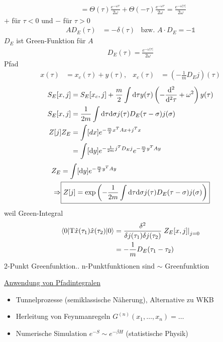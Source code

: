 \begin{enumerate}[1)]
\begin{align*}
				&= \Theta(\tau) \frac{e^{-\omega \tau}}{2 \omega} 
				+ \Theta (-\tau) \frac{e^{-\omega \tau}}{2 \omega} = \frac{e^{-\omega|\tau|}}{2 \omega}
			\end{align*}
			$+$ für $\tau < 0$ und $-$ für $\tau > 0$
			\begin{align*}
				A D_E(\tau) &= -\delta(\tau) & 
				\text{bzw. } A \cdot D_E = - \mathds{1} 
			\end{align*}
			$D_E$ ist Green-Funktion für $A$
			\begin{align*}
				\boxed{D_E (\tau) = \frac{e^{-\omega|\tau|}}{2 \omega}}
			\end{align*}
			Pfad 
			\begin{align*}
				x(\tau) &= x_c(\tau) + y(\tau) ,& x_c(\tau) &= \left(-\frac{1}{m} D_E j\right) (\tau)
			\end{align*}
			\begin{align*}
				S_E[x, j] &= S_E [x_c ,j]
				+ \frac{m}{2} \int \mathrm{d} \tau y (\tau) \left(-\frac{\mathrm{d}^2}{\mathrm{d}^2 \tau} + \omega^2\right)y(\tau) \\
				S_E[x , j] &= \frac{1}{2m} \int \mathrm{d} \tau \mathrm{d} \sigma 
				j(\tau) D_E (\tau - \sigma) j(\sigma) \\
				Z[j] Z_E &= \int [dx] e^{-\frac{m}{2} x^T A x + j^T x}  \\
				&= \int[\mathrm{d} y] e^{-\frac{1}{2m} j^T D_E j} e^{-\frac{m}{2} y^T A y}
			\end{align*}
			\begin{align*}
				Z_E &= \int [\mathrm{d} y] e^{-\frac{m}{2} y^T A y} \\
			\Rightarrow &
			\boxed{
					Z[j] = \exp \left(
						-\frac{1}{2 m} \int \mathrm{d} \tau \mathrm{d} \sigma j(\tau) D_E (\tau - \sigma) j(\sigma)
					\right)
				}
			\end{align*}
			weil Green-Integral
			\begin{align*}
			\braket{0 | \mathrm{T} \hat{x} (\tau_1) \hat{x}(\tau_2)| 0} &=
			\frac{\delta^2}{\delta j(\tau_1) \delta j(\tau_2)} \left.Z_E[x, j]\right|_{j = 0}\\
			&= -\frac{1}{m} D_E (\tau_1 - \tau_2) 
			\end{align*}
			2-Punkt Greenfunktion.. n-Punktfunktionen sind $\sim$ Greenfunktion
	\end{enumerate}
	
\underline{Anwendung von Pfadintegralen}
	\begin{itemize}
		\item Tunnelprozesse (semiklassische Näherung), Alternative zu WKB
		\item Herleitung von Feynmanregeln $G^{(n)}(x_1, \ldots, x_n) = \ldots$
		\item Numerische Simulation $e^{-S} \sim e^{-\beta H}$ (statistische Physik)
	\end{itemize}